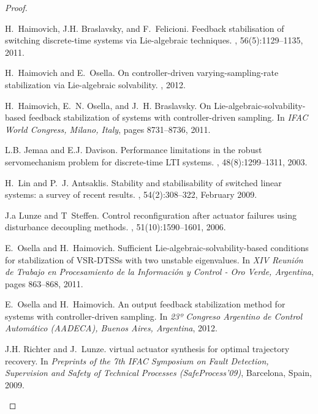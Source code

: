 \documentclass[letterpaper, 10 pt, conference]{ieeeconf}
\begin{document}
\begin{proof}
\begin{thebibliography}{10}
H.~Haimovich, J.H. Braslavsky, and F.~Felicioni.
\newblock Feedback stabilisation of switching discrete-time systems via
  {L}ie-algebraic techniques.
, 56(5):1129--1135, 2011.

H.~Haimovich and E.~Osella.
\newblock On controller-driven varying-sampling-rate stabilization via
  {Lie}-algebraic solvability.
, 2012.

H.~Haimovich, E.~N. Osella, and J.~H. Braslavsky.
\newblock On {Lie}-algebraic-solvability-based feedback stabilization of
  systems with controller-driven sampling.
\newblock In {\em IFAC World Congress, Milano, Italy}, pages 8731--8736, 2011.

L.B. Jemaa and E.J. Davison.
\newblock Performance limitations in the robust servomechanism problem for
  discrete-time {LTI} systems.
, 48(8):1299--1311, 2003.

H.~Lin and P.~J. Antsaklis.
\newblock Stability and stabilisability of switched linear systems: a survey of
  recent results.
, 54(2):308--322, February
  2009.

J.a Lunze and T~Steffen.
\newblock Control reconfiguration after actuator failures using disturbance
  decoupling methods.
, 51(10):1590--1601,
  2006.

E.~Osella and H.~Haimovich.
\newblock Sufficient {Lie-algebraic-solvability-based} conditions for
  stabilization of {VSR-DTSSs} with two unstable eigenvalues.
\newblock In {\em XIV Reuni\'on de Trabajo en Procesamiento de la Informaci\'on
  y Control - Oro Verde, Argentina}, pages 863--868, 2011.

E.~Osella and H.~Haimovich.
\newblock An output feedback stabilization method for systems with
  controller-driven sampling.
\newblock In {\em 23º Congreso Argentino de Control {Automático} (AADECA),
  Buenos Aires, Argentina}, 2012.

J.H. Richter and J.~Lunze.
 virtual actuator synthesis for optimal trajectory
  recovery.
\newblock In {\em Preprints of the 7th IFAC Symposium on Fault Detection,
  Supervision and Safety of Technical Processes (SafeProcess'09)}, Barcelona,
  Spain, 2009.


\end{thebibliography}
\end{proof}
\end{document}
